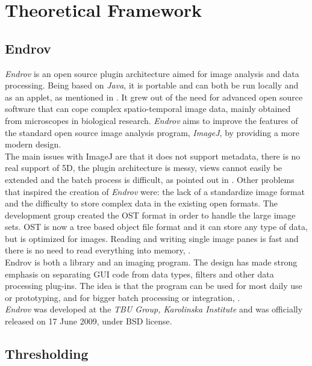 \thispagestyle{empty}
\cleardoublepage
\chapter{Theoretical Framework}
\label{sec:dev}
\section{Endrov}
\label{sec:endrov}

\emph{Endrov} is an open source plugin architecture aimed for image analysis and data processing.
Being based on \emph{Java}, it is portable and can both be run locally and as an applet, as mentioned
in \cite{web:endrov}. It grew out of the need for advanced open source software 
that can cope complex spatio-temporal image data, mainly obtained from microscopes in 
biological research. \emph{Endrov} aims to improve the features of the standard 
open source image analysis program, \emph{ImageJ}, by providing a more modern design.\\
The main issues with ImageJ are that it does not support metadata, there is no real support of 5D, 
the plugin architecture is messy, views cannot easily be extended and the batch 
process is difficult, as pointed out in \cite{web:endrovhome}.
Other problems that inspired the creation of \emph{Endrov} were: the lack of a standardize
image format and the difficulty to store complex data in the existing open formats.
The development group created the OST format in order
to handle the large image sets. OST is now a tree based object file format and it can store any 
type of data, but is optimized for images. 
Reading and writing single image panes is fast 
and there is no need to read everything into memory, \cite{web:endrovhome}.\\

Endrov is both a library and an imaging program. The design has made strong emphasis on 
separating GUI code from data types, filters and other data processing plug-ins. 
The idea is that the program can be used for most daily use or prototyping, and for 
bigger batch processing or integration, \cite{web:endrov}.\\

\emph{Endrov} was developed at the \emph{TBU Group, Karolinska Institute} and was officially released 
on 17 June 2009, under BSD license.



\section{Thresholding}
\label{sec:thresholding}

